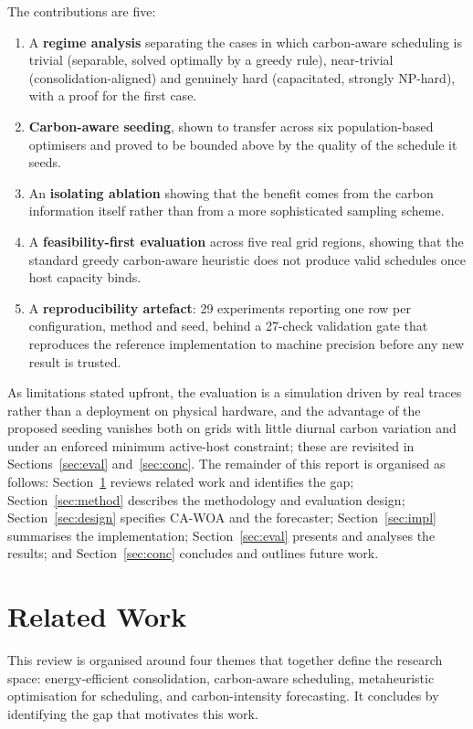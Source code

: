 \documentclass[12pt,a4paper]{article}
\begin{document}
The contributions are five:
\begin{enumerate}
\item A \textbf{regime analysis} separating the cases in which carbon-aware scheduling is trivial (separable,
solved optimally by a greedy rule), near-trivial (consolidation-aligned) and genuinely hard (capacitated,
strongly NP-hard), with a proof for the first case.
\item \textbf{Carbon-aware seeding}, shown to transfer across six population-based optimisers and proved to be
bounded above by the quality of the schedule it seeds.
\item An \textbf{isolating ablation} showing that the benefit comes from the carbon information itself rather
than from a more sophisticated sampling scheme.
\item A \textbf{feasibility-first evaluation} across five real grid regions, showing that the standard greedy
carbon-aware heuristic does not produce valid schedules once host capacity binds.
\item A \textbf{reproducibility artefact}: 29 experiments reporting one row per configuration, method and
seed, behind a 27-check validation gate that reproduces the reference implementation to machine precision
before any new result is trusted.
\end{enumerate}
As limitations stated upfront, the evaluation is a simulation driven by real traces rather than a deployment on
physical hardware, and the advantage of the proposed seeding vanishes both on grids with little diurnal carbon
variation and under an enforced minimum active-host constraint; these are revisited in
Sections~\ref{sec:eval} and~\ref{sec:conc}. The remainder of this report is organised as follows: Section~\ref{sec:related} reviews
related work and identifies the gap; Section~\ref{sec:method} describes the methodology and evaluation design;
Section~\ref{sec:design} specifies CA-WOA and the forecaster; Section~\ref{sec:impl} summarises the
implementation; Section~\ref{sec:eval} presents and analyses the results; and Section~\ref{sec:conc} concludes
and outlines future work.

\section{Related Work}\label{sec:related}
This review is organised around four themes that together define the research space: energy-efficient
consolidation, carbon-aware scheduling, metaheuristic optimisation for scheduling, and carbon-intensity
forecasting. It concludes by identifying the gap that motivates this work.
\end{document}
